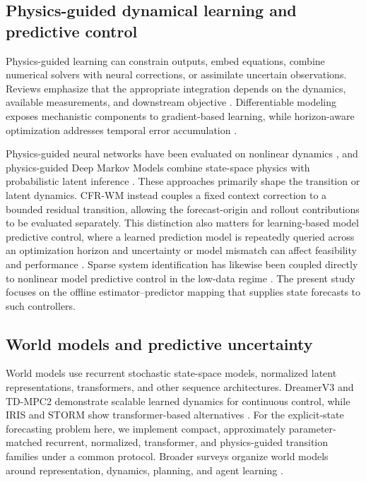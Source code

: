 \documentclass[iicol,pdflatex,sn-basic,Numbered]{sn-jnl}
\begin{document}
\subsection{Physics-guided dynamical learning and predictive control}

Physics-guided learning can constrain outputs, embed equations, combine
numerical solvers with neural corrections, or assimilate uncertain
observations. Reviews emphasize that the appropriate integration depends on the
dynamics, available measurements, and downstream objective
\cite{cuomo2022_scientific_machine_learning_through_physics,bradley2022_perspectives_on_the_integration_between,yu2024_learning_dynamical_systems_from_data}.
Differentiable modeling exposes mechanistic components to gradient-based
learning, while horizon-aware optimization addresses temporal error
accumulation
\cite{shen2023_differentiable_modelling_to_unify_machine,wang2024_respecting_causality_for_training_physics,list2022_learned_turbulence_modelling_with_differentiable}.

Physics-guided neural networks have been evaluated on nonlinear dynamics
\cite{robinson2022_physics_guided_neural_networks_for}, and physics-guided Deep
Markov Models combine state-space physics with probabilistic latent inference
\cite{liu2022_physics_guided_deep_markov_models}. These approaches primarily
shape the transition or latent dynamics. CFR-WM instead couples a fixed context
correction to a bounded residual transition, allowing the forecast-origin and
rollout contributions to be evaluated separately. This distinction also
matters for learning-based model predictive control, where a learned prediction
model is repeatedly queried across an optimization horizon and uncertainty or
model mismatch can affect feasibility and performance
\cite{hewing2020_learning_mpc}. Sparse system identification has likewise been
coupled directly to nonlinear model predictive control in the low-data regime
\cite{kaiser2018_sindy_mpc}. The present study focuses on the offline
estimator--predictor mapping that supplies state forecasts to such controllers.

\subsection{World models and predictive uncertainty}

World models use recurrent stochastic state-space models, normalized latent
representations, transformers, and other sequence architectures. DreamerV3 and
TD-MPC2 demonstrate scalable learned dynamics for continuous control, while
IRIS and STORM show transformer-based alternatives
\cite{hafner2025_mastering_diverse_control_tasks_through,hansen2023_td_mpc2_scalable_robust_world,micheli2022_transformers_are_sample_efficient_world,zhang2023_storm_efficient_stochastic_transformer_based}.
For the explicit-state forecasting problem here, we implement compact,
approximately parameter-matched recurrent, normalized, transformer, and
physics-guided transition families under a common protocol. Broader surveys
organize world models around representation, dynamics, planning, and agent
learning \cite{ding2025_understanding_world_or_predicting_future}.
\end{document}
